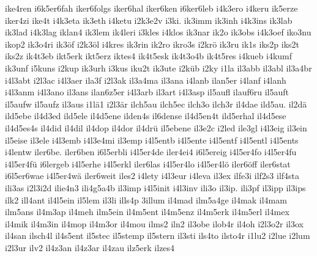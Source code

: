 {    ike4ren
    i6k5er6fah
    iker6folgs
    iker6hal
    iker6ken
    i6ker6leb
    i4k3ero
    i4keru
    ik5erze
    iker4zi
    ike4t
    i4k3eta
    ik3eth
    i4ketu
    i2k3e2v
    i3ki.
    ik3imm
    ik3inh
    i4k3ins
    ik3lab
    ik3lad
    i4k3lag
    iklan4
    ik3lem
    ik4leri
    i3kles
    i4klos
    ik3nar
    ik2o
    ik3obs
    i4k3oef
    iko3nu
    ikop2
    ik3o4ri
    ik3öf
    i2k3öl
    i4kres
    ik3rin
    ik2ro
    ikro3s
    i2krö
    ik3ru
    ik1s
    iks2p
    iks2t
    iks2z
    ik4t3eb
    ikt5erk
    ikt5erz
    iktes4
    ik4t5esk
    ik4t3o4b
    ik4t5res
    i4kueb
    i4kumf
    ik3unf
    i5kuns
    i2kup
    ik3urh
    i3kus
    iku2t
    ik3ute
    i2küb
    i2ky
    i1la
    il3abb
    il3abl
    il3a4br
    i4l3abt
    i2l3ac
    i4l3aer
    ila3f
    i2l3ak
    il3a4ma
    il3ana
    i4lanb
    ilan5er
    i4lanf
    i4lanh
    i4l3anm
    i4l3ano
    il3ans
    ilan6z5er
    i4l3arb
    il3art
    i4l3asp
    il5aufl
    ilauf6ru
    il5auft
    il5aufw
    il5aufz
    il3aus
    i1lä1
    i2l3är
    ilch5au
    ilch5ec
    ilch3o
    ilch3r
    il4dae
    ild5au.
    il2dä
    ild5ebe
    il4d3ed
    ild5ele
    il4d5ene
    ilden4s
    il6dense
    il4d5en4t
    ild5erhal
    il4d5ese
    il4d5es4s
    il4did
    il4dil
    il4dop
    il4dor
    il4drü
    il5ebene
    il3e2c
    i2led
    ile3gl
    i4l3eig
    il3ein
    il5eise
    il3ele
    i4l3emb
    i4l3e4mi
    il3emp
    i4l5entb
    i4l5ente
    i4l5entf
    i4l5entl
    i4l5ents
    i4lentw
    iler6be.
    iler6ben
    i6l5erbli
    i4l5er4de
    iler4ei4
    i6l5ereig
    i4l5er4fo
    i4l5er4fu
    i4l5er4fü
    i6lergeb
    i4l5erhe
    i4l5erkl
    iler6las
    i4l5er4lo
    i4l5er4lö
    iler6öff
    iler6stat
    i6l5er6wae
    i4l5er4wä
    iler6weit
    iles2
    i4lety
    i4l3eur
    i4leva
    il3ex
    ilfe3i
    ilf2s3
    ilf4sta
    ili3as
    i2l3i2d
    ilie4n3
    ili4g5a4b
    il3imp
    i4l5init
    i4l3inv
    ili3o
    il3ip.
    ili3pf
    il3ipp
    il3ips
    ilk2
    ill4ant
    il4l5ein
    il5lem
    il3li
    ills4p
    3illum
    il4mad
    ilm5a4ge
    il4mak
    il4mam
    ilm5ans
    il4m3ap
    il4meh
    ilm5ein
    il4m5ent
    il4m5enz
    il4m5erk
    il4m5erl
    il4mex
    il4mik
    il4m3in
    il4mop
    il4m3or
    il4mou
    ilms2
    iln2
    il3obe
    ilob4r
    il4oh
    i2l3o2r
    il3ox
    il4san
    ilsch4l
    il4s5ent
    il5stec
    il5stemp
    il5stern
    il3sti
    ils4to
    ilsto4r
    i1lu2
    i2lue
    i2lum
    i2l3ur
    ilv2
    il4z3an
    il4z3ar
    il4zau
    ilz5erk
    ilzes4
}
